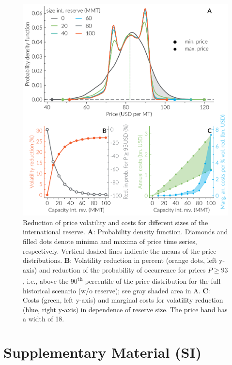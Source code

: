 \documentclass[12pt]{article}
\begin{document}
\begin{figure}[htbp]
\centering  \includegraphics[width=.8\textwidth]{plots/arti_ts_2010_15/pdf_and_costs2grid.pdf}
\caption{Reduction of price volatility and costs for different sizes of the international reserve.  \textbf{A}: Probability density function. Diamonds and filled dots denote minima and maxima of price time series, respectively. Vertical dashed lines indicate the means of the price distributions. \textbf{B}: Volatility reduction in percent (orange dots, left y-axis) and reduction of the probability of occurrence for prices $P\geq 93$\USD, i.e., above the 90\textsuperscript{th} percentile of the price distribution for the full historical scenario (w/o reserve); see gray shaded area in A. \textbf{C}: Costs (green, left y-axis) and marginal costs for volatility reduction (blue, right y-axis) in dependence of reserve size. The price band has a width of 18\USD.}
  \label{fig:Fig3}
\end{figure}

\clearpage
\appendix
\setcounter{figure}{0}
\setcounter{table}{0}
\renewcommand{\thetable}{S\arabic{table}}
\renewcommand{\thefigure}{S\arabic{figure}}

\section*{Supplementary Material (SI)}
\label{sec:SI}

\end{document}
